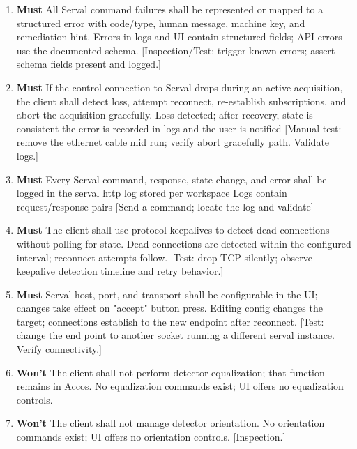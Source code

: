 \documentclass[12pt]{article}
\newcommand{\PriorityTag}[2]{%
  \colorbox{#2!25}{\footnotesize\textsf{\textbf{#1}}}\hspace{0.6em}}
\newcommand{\must}{\leavevmode\PriorityTag{Must}{green}}
\newcommand{\wont}{\leavevmode\PriorityTag{Won't}{red}}
\newcounter{reqgrp}[section] %
\newcounter{reqno}
\newcommand{\reqprefix}{GEN}
\newenvironment{requirements}[1]{%
  \renewcommand{\reqprefix}{#1}%
  \refstepcounter{reqgrp}%
  \setcounter{reqno}{0}%
  \begin{enumerate}[leftmargin=*]
}{\end{enumerate}}
\begin{document}
\begin{requirements}{SRV}
\item \must {}
  {All Serval command failures shall be represented or mapped to a structured error with code/type, human message, machine key, and remediation hint.}
  {Errors in logs and UI contain structured fields; API errors use the documented schema.}
  [Inspection/Test: trigger known errors; assert schema fields present and logged.]

\item \must {}
  {If the control connection to Serval drops during an active acquisition, the client shall detect loss, attempt reconnect, re-establish subscriptions, and abort the acquisition gracefully.}
  {Loss detected; after recovery, state is consistent the error is recorded in logs and the user is notified}
  [Manual test: remove the ethernet cable mid run; verify abort gracefully path. Validate logs.]

\item \must {}
  {Every Serval command, response, state change, and error shall be logged in the serval http log stored per workspace}
  {Logs contain request/response pairs}
  [Send a command; locate the log and validate]

\item \must {}
  {The client shall use protocol keepalives to detect dead connections without polling for state.}
  {Dead connections are detected within the configured interval; reconnect attempts follow.}
  [Test: drop TCP silently; observe keepalive detection timeline and retry behavior.]

\item \must {}
  {Serval host, port, and transport shall be configurable in the UI; changes take effect on "accept" button press.}
  {Editing config changes the target; connections establish to the new endpoint after reconnect.}
  [Test: change the end point to another socket running a different serval instance. Verify connectivity.]

\item \wont {}
  {The client shall not perform detector equalization; that function remains in Accos.}
  {No equalization commands exist; UI offers no equalization controls.}

\item \wont {}
  {The client shall not manage detector orientation.}
  {No orientation commands exist; UI offers no orientation controls.}
  [Inspection.]

\end{requirements}
\end{document}
